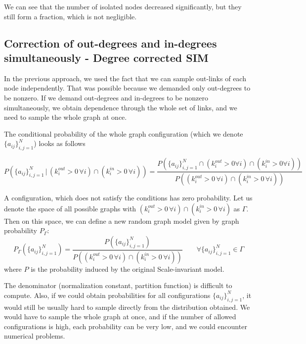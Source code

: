 We can see that the number of isolated nodes decreased significantly, but they still form a fraction, which is not negligible.

\subsection{Correction of out-degrees and in-degrees simultaneously - Degree corrected SIM}
In the previous approach, we used the fact that we can sample out-links of each node independently. That was possible because we demanded only out-degrees to be nonzero. If we demand out-degrees and in-degrees to be nonzero simultaneously, we obtain dependence through the whole set of links, and we need to sample the whole graph at once.

The conditional probability of the whole graph configuration (which we denote $\{a_{ij}\}_{i,j=1}^N$) looks as follows

\begin{equation}
    P\left(\{a_{ij}\}_{i,j=1}^N \, | \, (k_i^{out} > 0 \, \forall i) \cap (k_i^{in} > 0 \, \forall i )\right) = \frac{P\left(\{a_{ij}\}_{i,j=1}^N \cap (k_i^{out} > 0 \forall i) \cap (k_i^{in} > 0 \forall i )\right)}{P\left((k_i^{out} > 0 \, \forall i) \cap (k_i^{in} > 0 \, \forall i )\right)}
\end{equation}

A configuration, which does not satisfy the conditions has zero probability. Let us denote the space of all possible graphs with $(k_i^{out} > 0 \, \forall i) \cap (k_i^{in} > 0 \, \forall i )$ as $\Gamma$. Then on this space, we can define a new random graph model given by graph probability $P_\Gamma$:
\begin{equation}
    P_\Gamma\left(\{a_{ij}\}_{i,j=1}^N\right) = \frac{P\left(\{a_{ij}\}_{i,j=1}^N\right)}{P\left((k_i^{out} > 0 \, \forall i) \cap (k_i^{in} > 0 \, \forall i )\right)} \qquad \forall \{a_{ij}\}_{i,j=1}^N \in \Gamma
\end{equation}
where $P$ is the probability induced by the original Scale-invariant model. 

The denominator (normalization constant, partition function) is difficult to compute. Also, if we could obtain probabilities for all configurations $\{a_{ij}\}_{i,j=1}^N$, it would still be usually hard to sample directly from the distribution obtained. We would have to sample the whole graph at once, and if the number of allowed configurations is high, each probability can be very low, and we could encounter numerical problems.

